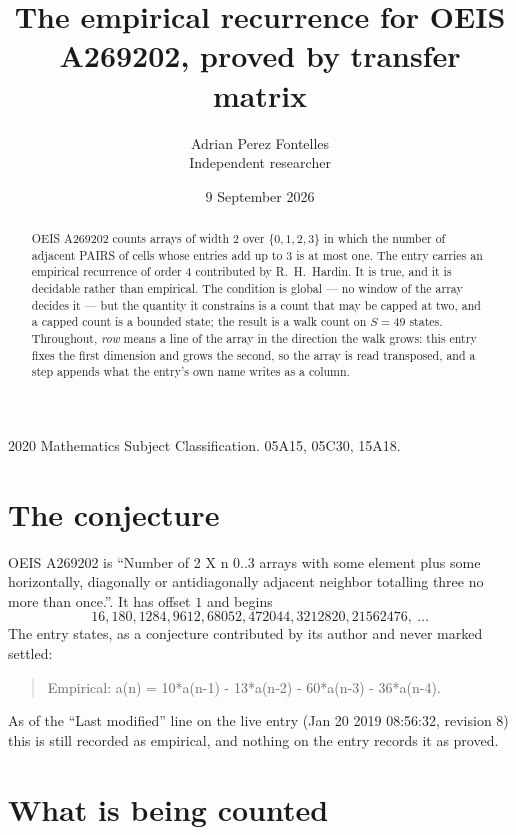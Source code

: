 \documentclass[11pt,a4paper]{article}
\title{The empirical recurrence for OEIS A269202, proved by transfer matrix}
\author{Adrian Perez Fontelles\\ \small Independent researcher}
\date{9 September 2026}
\theoremstyle{plain}
\theoremstyle{definition}
\begin{document}
\maketitle

\begin{abstract}
OEIS A269202 counts arrays of width $2$ over $\{0,1,2,3\}$ in which the number of adjacent PAIRS of
cells whose entries add up to $3$ is at most one. The entry carries an empirical recurrence of
order $4$ contributed by R.~H.~Hardin. It is true, and it is decidable rather than
empirical. The condition is global --- no window of the array decides it --- but the quantity
it constrains is a count that may be capped at two, and a capped count is a bounded state; the
result is a walk count on $S=49$ states.
 Throughout, \emph{row} means a line of the array in the direction the walk grows: this entry fixes the first dimension and grows the second, so the array is read transposed, and a step appends what the entry's own name writes as a column.\end{abstract}

\noindent\small 2020 Mathematics Subject Classification. 05A15, 05C30, 15A18.\normalsize

\section{The conjecture}

OEIS A269202 is ``Number of 2 X n 0..3 arrays with some element plus some horizontally, diagonally or antidiagonally adjacent neighbor totalling three no more than once.''. It has offset $1$ and begins
\[
16, 180, 1284, 9612, 68052, 472044, 3212820, 21562476,\ \dots
\]
The entry states, as a conjecture contributed by its author and never marked settled:
\begin{quote}
Empirical: a(n) = 10*a(n-1) - 13*a(n-2) - 60*a(n-3) - 36*a(n-4).
\end{quote}
As of the ``Last modified'' line on the live entry (Jan 20 2019 08:56:32, revision 8) this is still
recorded as empirical, and nothing on the entry records it as proved.

\section{What is being counted}
\end{document}
